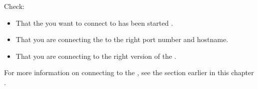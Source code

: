 


Check:
\begin{itemize}
\item That the \gdagent you want to connect to has been started .
\item That you are connecting the \gdagent to the right port number and \gdagent hostname. 
\item That you are connecting to the right version of the \gdagent{}. 
 
\end{itemize}

For more information on connecting to the \gdagent, see the section earlier in this chapter .

